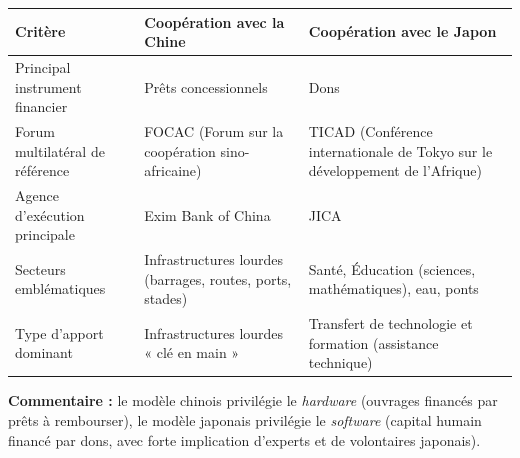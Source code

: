 \documentclass[11pt]{article}
\begin{document}
\begin{corrige}
\begin{center}
\begin{tabularx}{\linewidth}{|l|X|X|}
\hline
\rowcolor{popblueL}
\textbf{Critère} & \textbf{Coopération avec la Chine} & \textbf{Coopération avec le Japon} \\
\hline
Principal instrument financier & Prêts concessionnels & Dons \\
\hline
Forum multilatéral de référence & FOCAC (Forum sur la coopération sino-africaine) & TICAD (Conférence internationale de Tokyo sur le développement de l'Afrique) \\
\hline
Agence d'exécution principale & Exim Bank of China & JICA \\
\hline
Secteurs emblématiques & Infrastructures lourdes (barrages, routes, ports, stades) & Santé, Éducation (sciences, mathématiques), eau, ponts \\
\hline
Type d'apport dominant & Infrastructures lourdes « clé en main » & Transfert de technologie et formation (assistance technique) \\
\hline
\end{tabularx}
\end{center}
\textbf{Commentaire :} le modèle chinois privilégie le \emph{hardware} (ouvrages financés par prêts à rembourser), le modèle japonais privilégie le \emph{software} (capital humain financé par dons, avec forte implication d'experts et de volontaires japonais).
\end{corrige}
\end{document}
